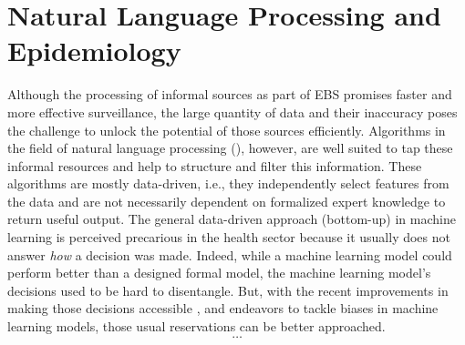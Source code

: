 \section{Natural Language Processing and Epidemiology}
  Although the processing of informal sources as part of EBS promises faster and more effective surveillance, the large quantity of data and their inaccuracy poses the challenge to unlock the potential of those sources efficiently.
  Algorithms in the field of natural language processing (), however, are well suited to tap these informal resources and help to structure and filter this information.
  These algorithms are mostly data-driven, i.e., they independently select features from the data and are not necessarily dependent on formalized expert knowledge to return useful output.
  The general data-driven approach (bottom-up) in machine learning is perceived precarious in the health sector because it usually does not answer \emph{how} a decision was made.
  Indeed, while a machine learning model could perform better than a designed formal model, the machine learning model's decisions used to be hard to disentangle.
  But, with the recent improvements in making those decisions accessible \citep{Arras2017}, and endeavors to tackle biases in machine learning models, those usual reservations can be better approached.
  \[\dots\]



